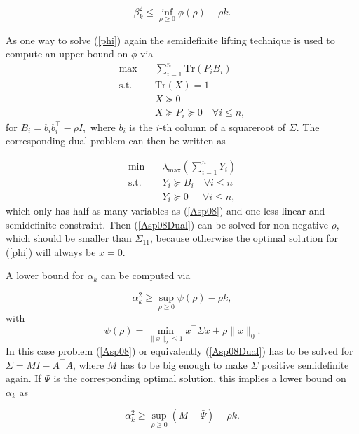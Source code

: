 \documentclass[a4paper,11pt,1p]{elsarticle}
\newcommand{\Norm}[2]{\lVert{#1}\rVert_{#2}}
\newcommand{\T}{^{\top}}
\newcommand{\Tr}{\text{Tr}}
\begin{document}
\begin{equation*}
 \beta_k^2 \leq \inf_{\rho \geq 0} \phi(\rho) + \rho k.
\end{equation*}

As one way to solve (\ref{phi}) again the semidefinite lifting technique is used to compute an upper bound on $\phi$ via
\begin{align}\label{Asp08}
 \max \quad & \sum_{i=1}^n\Tr(P_iB_i) \nonumber \\
 \text{s.t.} \quad & \Tr(X) = 1 \nonumber \\
 & X \succeq 0 \tag{A2-Primal} \\
 & X \succeq P_i \succeq 0 \quad \forall i \leq n, \nonumber
\end{align}
for $B_i = b_ib_i\T - \rho I,$ where $b_i$ is the $i$-th column of a squareroot of $\Sigma$. The corresponding dual problem can then be written as 
 
\begin{align}\label{Asp08Dual}
  \min \quad & \lambda_{\max}\left(\sum_{i=1}^n Y_i \right) \nonumber \\
  \text{s.t.} \quad & Y_i \succeq B_i \quad \forall i \leq n \tag{A2-Dual} \\
  & Y_i \succeq 0 \quad \ \ \forall i \leq n, \nonumber
\end{align}
which only has half as many variables as (\ref{Asp08}) and one less linear and semidefinite constraint. Then (\ref{Asp08Dual}) can be solved for non-negative $\rho$, which should be smaller than $\Sigma_{11}$, because otherwise the
optimal solution for (\ref{phi}) will always be $x=0$. 

A lower bound for $\alpha_k$ can be computed via

\begin{equation*}
 \alpha_k^2 \geq \sup_{\rho \geq 0} \psi(\rho) - \rho k,
\end{equation*}
with 
\begin{equation*}
 \psi(\rho) = \min_{\Norm{x}{2} \leq 1} x\T \Sigma x + \rho \Norm{x}{0}.
\end{equation*}
In this case problem (\ref{Asp08}) or equivalently (\ref{Asp08Dual}) has to be solved for $\Sigma = M I - A\T A$, where $M$ has to be big enough to make $\Sigma$ positive semidefinite again. If $\bar{\Psi}$ is the corresponding optimal solution, this implies
a lower bound on $\alpha_k$ as

\begin{equation*}
 \alpha_k^2 \geq \sup_{\rho \geq 0} (M - \bar{\Psi}) - \rho k.
\end{equation*}
\end{document}
